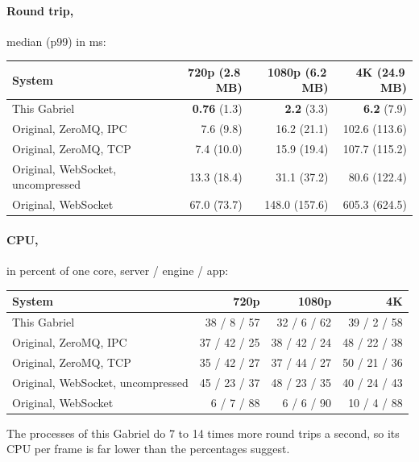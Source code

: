 \documentclass[11pt]{article}
\begin{document}
\paragraph{Round trip,} median (p99) in ms:
\begin{center}
\small
\begin{tabular}{@{}lrrr@{}}
\toprule
System & 720p (2.8\,MB) & 1080p (6.2\,MB) & 4K (24.9\,MB) \\
\midrule
This Gabriel              & \textbf{0.76} (1.3) & \textbf{2.2} (3.3)
                          & \textbf{6.2} (7.9) \\
Original, ZeroMQ, IPC     & 7.6 (9.8)   & 16.2 (21.1)  & 102.6 (113.6) \\
Original, ZeroMQ, TCP     & 7.4 (10.0)  & 15.9 (19.4)  & 107.7 (115.2) \\
Original, WebSocket, uncompressed
                          & 13.3 (18.4) & 31.1 (37.2)  & 80.6 (122.4) \\
Original, WebSocket       & 67.0 (73.7) & 148.0 (157.6) & 605.3 (624.5) \\
\bottomrule
\end{tabular}
\end{center}

\paragraph{CPU,} in percent of one core, server / engine / app:
\begin{center}
\small
\begin{tabular}{@{}lrrr@{}}
\toprule
System & 720p & 1080p & 4K \\
\midrule
This Gabriel              & 38 / 8 / 57  & 32 / 6 / 62  & 39 / 2 / 58 \\
Original, ZeroMQ, IPC     & 37 / 42 / 25 & 38 / 42 / 24 & 48 / 22 / 38 \\
Original, ZeroMQ, TCP     & 35 / 42 / 27 & 37 / 44 / 27 & 50 / 21 / 36 \\
Original, WebSocket, uncompressed
                          & 45 / 23 / 37 & 48 / 23 / 35 & 40 / 24 / 43 \\
Original, WebSocket       & 6 / 7 / 88   & 6 / 6 / 90   & 10 / 4 / 88 \\
\bottomrule
\end{tabular}
\end{center}
The processes of this Gabriel do 7 to 14 times more round trips a second, so
its CPU per frame is far lower than the percentages suggest.
\end{document}
